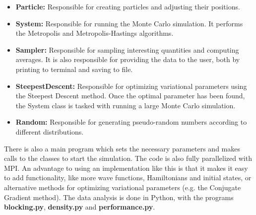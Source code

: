 \documentclass[../main.tex]{subfiles}
\begin{document}
\begin{appendices}
\begin{itemize}
\begin{itemize}
    \end{itemize}
    \item {\bf Particle:} Responsible for creating particles and adjusting their positions.
    \item {\bf System:} Responsible for running the Monte Carlo simulation. It performs the Metropolis and Metropolis-Hastings algorithms.
    \item {\bf Sampler:} Responsible for sampling interesting quantities and computing averages. It is also responsible for providing the data to the user, both by printing to terminal and saving to file.
    \item {\bf SteepestDescent:} Responsible for optimizing variational parameters using the Steepest Descent method. Once the optimal parameter has been found, the System class is tasked with running a large Monte Carlo simulation.
    \item {\bf Random:} Responsible for generating pseudo-random numbers according to different distributions.
\end{itemize}

There is also a main program which sets the necessary parameters and makes calls to the classes to start the simulation. The code is also fully parallelized with MPI. An advantage to using an implementation like this is that it makes it easy to add functionality, like more wave functions, Hamiltonians and initial states, or alternative methods for optimizing variational parameters (e.g. the Conjugate Gradient method). The data analysis is done in Python, with the programs {\bf blocking.py}, {\bf density.py} and \textbf{performance.py}.
\end{appendices}
\end{document}
